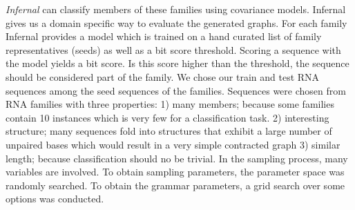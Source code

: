 \documentclass{article}
\begin{document}
\emph{Infernal}\cite{infernal} can classify members of these families using
covariance models. Infernal gives us a domain specific way to evaluate
the generated graphs. 
For each family Infernal provides a model which is trained on 
a hand curated list of family representatives (seeds) as well as a 
bit score threshold. Scoring a sequence with the model yields a bit score.
Is this score higher than the threshold, the sequence should be considered 
part of the family. 
We chose our train and test RNA sequences among the seed sequences of the 
families. 
Sequences were chosen from RNA families with three properties:
1) many members; because some families contain 10
instances which is very few for a classification task. 2)  interesting 
structure; many sequences fold into structures that exhibit a large number of 
unpaired bases which would result in a very simple contracted graph
3) similar length; because classification should no be trivial.
In the sampling process, many variables are involved.
To obtain 
sampling parameters, the parameter space was randomly searched.
To obtain the grammar parameters, a grid search over some options was conducted.
\end{document}
